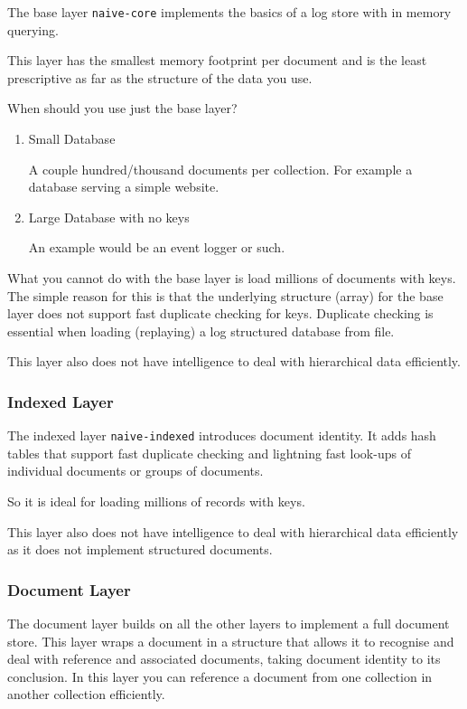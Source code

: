 \documentclass[11pt]{article}
\begin{document}
The base layer \texttt{naive-core} implements the basics of a log store with
in memory querying.

This layer has the smallest memory footprint per document and is the
least prescriptive as far as the structure of the data you use.

When should you use just the base layer?

\begin{enumerate}
\item Small Database

A couple hundred/thousand documents per collection. For example a
database serving a simple website.

\item Large Database with no keys

An example would be an event logger or such.
\end{enumerate}

What you cannot do with the base layer is load millions of documents
with keys. The simple reason for this is that the underlying structure
(array) for the base layer does not support fast duplicate checking
for keys. Duplicate checking is essential when loading (replaying) a log
structured database from file.

This layer also does not have intelligence to deal with hierarchical
data efficiently.

\subsubsection{Indexed Layer}
\label{sec:org7d2d620}

The indexed layer \texttt{naive-indexed} introduces document identity. It
adds hash tables that support fast duplicate checking and lightning
fast look-ups of individual documents or groups of documents.

So it is ideal for loading millions of records with keys.

This layer also does not have intelligence to deal with hierarchical
data efficiently as it does not implement structured documents.

\subsubsection{Document Layer}
\label{sec:org4499a22}

The document layer builds on all the other layers to implement a full
document store. This layer wraps a document in a structure that allows it to
recognise and deal with reference and associated documents, taking
document identity to its conclusion. In this layer you can reference a
document from one collection in another collection efficiently.
\end{document}
